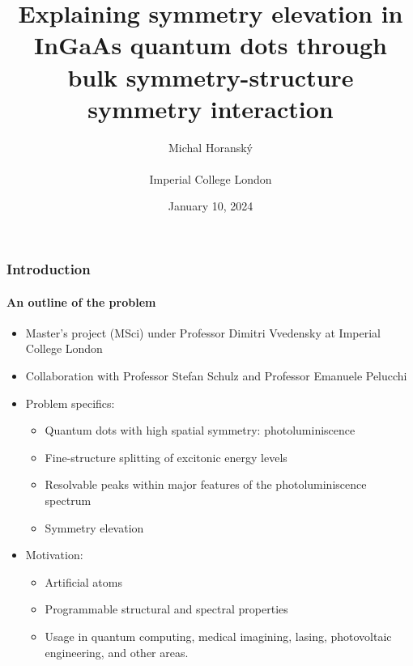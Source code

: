 \documentclass[english]{beamer}
\begin{document}
  \title{Explaining symmetry elevation in InGaAs quantum dots through bulk symmetry-structure symmetry interaction}
  \author[Michal Horanský]{Michal Horanský\\\hfill\\Imperial College London}
  \date{January 10, 2024}
  \begin{frame}
    \titlepage
  \end{frame}
  
  
  \begin{frame}
  	\frametitle{Introduction}
  	\framesubtitle{An outline of the problem}
  	\begin{itemize}
  		\item Master's project (MSci) under Professor Dimitri Vvedensky at Imperial College London
  		\item Collaboration with Professor Stefan Schulz and Professor Emanuele Pelucchi
  		\item Problem specifics:
  		\begin{itemize}
  		\item Quantum dots with high spatial symmetry: photoluminiscence
  		\item Fine-structure splitting of excitonic energy levels
  		\item Resolvable peaks within major features of the photoluminiscence spectrum
  		\item Symmetry elevation
  		\end{itemize}
  		\item Motivation:
  		\begin{itemize}
  		\item Artificial atoms
  		\item Programmable structural and spectral properties
  		\item Usage in quantum computing, medical imagining, lasing, photovoltaic engineering, and other areas.
  		\end{itemize}
  	\end{itemize}
  \end{frame}
  
\end{document}
